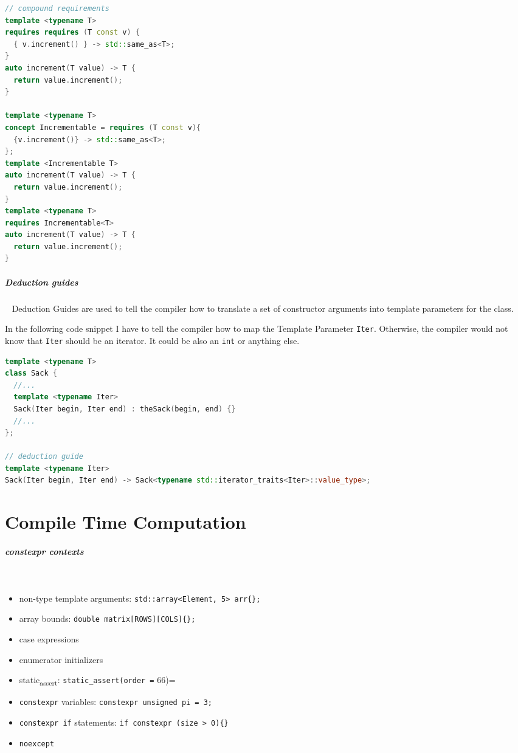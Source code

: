 \documentclass[11pt,twoside,landscape]{article}
\begin{document}
\begin{multicols}{2}
\begin{lstlisting}[language=c++,label=lst:compound-requirements-exmaple,caption={Compound requirements exmaple},captionpos=b,numbers=none]
// compound requirements
template <typename T>
requires requires (T const v) {
  { v.increment() } -> std::same_as<T>;
}
auto increment(T value) -> T {
  return value.increment();
}

template <typename T>
concept Incrementable = requires (T const v){
  {v.increment()} -> std::same_as<T>;
};
template <Incrementable T>
auto increment(T value) -> T {
  return value.increment();
}
template <typename T>
requires Incrementable<T>
auto increment(T value) -> T {
  return value.increment();
}
\end{lstlisting}

\subparagraph{Deduction guides} \
\label{sec:orgaa7fbd8}
Deduction Guides are used to tell the compiler how to translate a set of constructor arguments into template parameters for the class.

In the following code snippet I have to tell the compiler how to map the Template Parameter \texttt{Iter}.
Otherwise, the compiler would not know that \texttt{Iter} should be an iterator.
It could be also an \texttt{int} or anything else.


\begin{lstlisting}[language=c++,numbers=none]
template <typename T>
class Sack {
  //...
  template <typename Iter>
  Sack(Iter begin, Iter end) : theSack(begin, end) {}
  //...
};

// deduction guide
template <typename Iter>
Sack(Iter begin, Iter end) -> Sack<typename std::iterator_traits<Iter>::value_type>;
\end{lstlisting}

\section{Compile Time Computation}
\label{sec:orge60624a}
\subparagraph{constexpr contexts} \
\label{sec:org16a58d8}
\begin{itemize}
\item non-type template arguments: \texttt{std::array<Element, 5> arr\{\};}
\item array bounds: \texttt{double matrix[ROWS][COLS]\{\};}
\item case expressions
\item enumerator initializers
\item static\textsubscript{assert}: \texttt{static\_assert(order =} 66)=
\item \texttt{constexpr} variables: \texttt{constexpr unsigned pi = 3;}
\item \texttt{constexpr if} statements: \texttt{if constexpr (size > 0)\{\}}
\item \texttt{noexcept}
\end{itemize}


\end{multicols}
\end{document}
